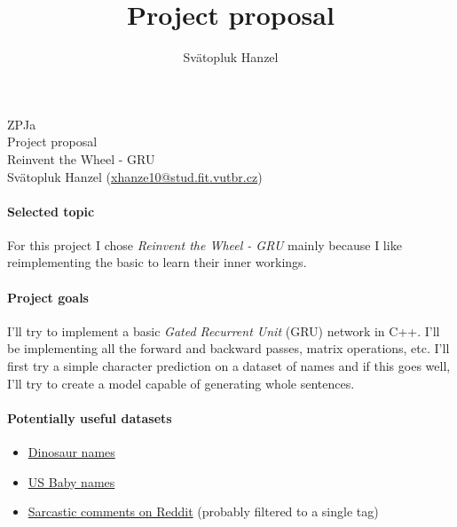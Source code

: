 \documentclass[11pt,a4paper]{article}
\author{Svätopluk Hanzel}
\title{Project proposal}
\begin{document}
	\begin{center}
		{\large ZPJa}\\
		{\large Project proposal}\\\vspace{0.5cm}
		{\Huge Reinvent the Wheel - GRU}\\\vspace{0.5cm}
		Svätopluk Hanzel (\href{mailto:xhanze10@stud.fit.vutbr.cz}{xhanze10@stud.fit.vutbr.cz})\\
	\end{center}
	\vspace{2em}

	\paragraph{Selected topic} For this project I chose \textit{Reinvent the Wheel - GRU} mainly because I like reimplementing the basic to learn their inner workings.
	\paragraph{Project goals} I'll try to implement a basic \textit{Gated Recurrent Unit} (GRU) network in C++. I'll be implementing all the forward and backward passes, matrix operations, etc. I'll first try a simple character prediction on a dataset of names and if this goes well, I'll try to create a model capable of generating whole sentences.
	\paragraph{Potentially useful datasets}
		\begin{itemize}
			\item \href{https://www.kaggle.com/kumazaki98/dinosaur-list}{Dinosaur names}
			\item \href{https://www.kaggle.com/kaggle/us-baby-names}{US Baby names}
			\item \href{https://www.kaggle.com/sherinclaudia/sarcastic-comments-on-reddit}{Sarcastic comments on Reddit} (probably filtered to a single tag)
		\end{itemize}
	
	\vspace{2cm}
	\nocite{*}
    
\end{document}
